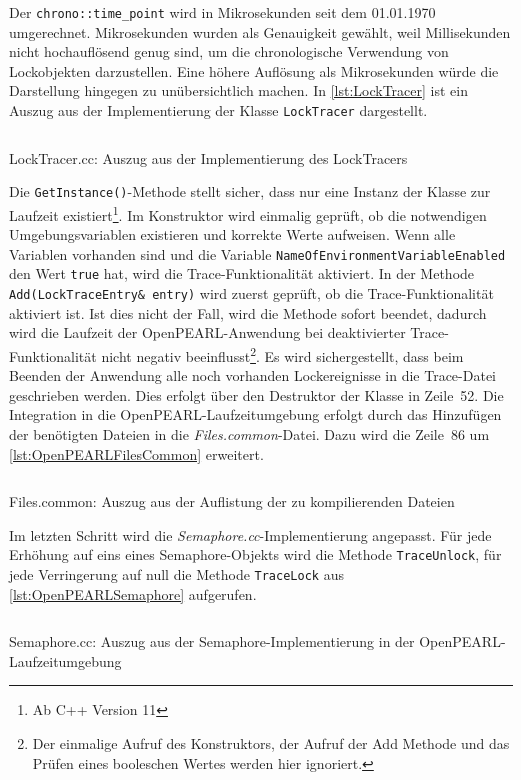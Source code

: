 Der \texttt{chrono::\-time\_point} wird in Mikrosekunden seit dem 01.01.1970
umgerechnet. Mikrosekunden wurden als Genauigkeit gewählt, weil Millisekunden
nicht hochauflösend genug sind, um die chronologische Verwendung von
Lockobjekten darzustellen. Eine höhere Auflösung als Mikrosekunden würde die
Darstellung hingegen zu unübersichtlich machen. In \cref{lst:LockTracer} ist ein
Auszug aus der Implementierung der Klasse \texttt{Lock\-Tracer} dargestellt.
\begin{listing}[ht]
  \inputminted[frame=lines,linenos,firstline=11,lastline=58]{cpp}{./cpp/LockTracer.cc}
  \caption{LockTracer.cc: Auszug aus der Implementierung des LockTracers}
  \label{lst:LockTracer}
\end{listing}
Die \texttt{Get\-Instance()}-Methode stellt sicher, dass nur eine Instanz der
Klasse zur Laufzeit existiert\footnote{Ab C++ Version 11}. Im Konstruktor wird
einmalig geprüft, ob die notwendigen Umgebungsvariablen existieren und korrekte
Werte aufweisen. Wenn alle Variablen vorhanden sind und die Variable
\texttt{Name\-Of\-Environment\-Variable\-Enabled} den Wert \texttt{true} hat,
wird die Trace-Funktionalität aktiviert. In der Methode
\texttt{Add(Lock\-Trace\-Entry\& entry)} wird zuerst geprüft, ob die
Trace-Funktionalität aktiviert ist. Ist dies nicht der Fall, wird die Methode
sofort beendet, dadurch wird die Laufzeit der OpenPEARL-Anwendung bei
deaktivierter Trace-Funktionalität nicht negativ beeinflusst\footnote{Der
einmalige Aufruf des Konstruktors, der Aufruf der Add Methode und das Prüfen
eines booleschen Wertes werden hier ignoriert.}. Es wird sichergestellt, dass
beim Beenden der Anwendung alle noch vorhanden Lockereignisse in die Trace-Datei
geschrieben werden. Dies erfolgt über den Destruktor der Klasse in Zeile~52. Die
Integration in die OpenPEARL-Laufzeitumgebung erfolgt durch das Hinzufügen der
benötigten Dateien in die \emph{Files.common}-Datei. Dazu wird die Zeile~86 um
\cref{lst:OpenPEARLFilesCommon} erweitert.
\begin{listing}[ht]
  \inputminted[frame=lines,linenos,firstline=86,lastline=88]{bash}{./OpenPEARL/Files.common}
  \caption{Files.common: Auszug aus der Auflistung der zu kompilierenden Dateien}
  \label{lst:OpenPEARLFilesCommon}
\end{listing}
Im letzten Schritt wird die \emph{Semaphore.cc}-Implementierung angepasst. Für
jede Erhöhung auf eins eines Semaphore-Objekts wird die Methode
\texttt{Trace\-Unlock}, für jede Verringerung auf null die Methode
\texttt{Trace\-Lock} aus \cref{lst:OpenPEARLSemaphore} aufgerufen.
\begin{listing}[ht]
  \inputminted[frame=lines,linenos,firstline=93,lastline=111]{cpp}{./OpenPEARL/Semaphore.cc}
  \caption{Semaphore.cc: Auszug aus der Semaphore-Implementierung in der OpenPEARL-Laufzeitumgebung}
  \label{lst:OpenPEARLSemaphore}
\end{listing}

